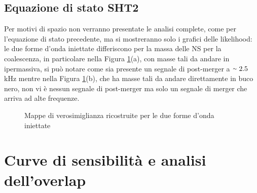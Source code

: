 \subsection{Equazione di stato SHT2}
\label{subsection:SHT2}
Per motivi di spazio non verranno presentate le analisi complete, come per l'equazione di stato precedente, ma si mostreranno solo i grafici delle likelihood: le due forme d'onda iniettate differiscono per la massa delle NS per la coalescenza, in particolare nella Figura \ref{fig:likelihood_sht2}(a), con masse tali da andare in ipermassiva, si può notare come sia presente un segnale di post-merger a $\smallsim 2.5$kHz mentre nella Figura \ref{fig:likelihood_sht2}(b), che ha masse tali da andare direttamente in buco nero, non vi è nessun segnale di post-merger ma solo un segnale di merger che arriva ad alte frequenze. 
\begin{figure}[H]
	\vspace{-20pt}
	\centering
	\vspace{-5pt}
	\caption{Mappe di verosimiglianza ricostruite per le due forme d'onda iniettate}
	\label{fig:likelihood_sht2}
	\vspace{-15pt}
\end{figure}

\section{Curve di sensibilità e analisi dell'overlap}
\label{section:overlap}
